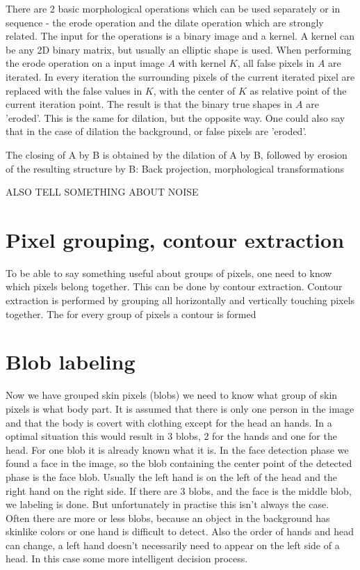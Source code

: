 There are 2 basic morphological operations which can be used separately or in sequence - the erode operation and the dilate operation which are strongly related. The input for the operations is a binary image and a kernel. A kernel can be any 2D binary matrix, but usually an elliptic shape is used. When performing the erode operation on a input image $A$ with kernel $K$, all false pixels in $A$ are iterated. In every iteration the surrounding pixels of the current iterated pixel are replaced with the false values in $K$, with the center of $K$ as relative point of the current iteration point. The result is that the binary true shapes in $A$ are 'eroded'. This is the same for dilation, but the opposite way. One could also say that in the case of dilation the background, or false pixels are 'eroded'.

The closing of A by B is obtained by the dilation of A by B, followed by erosion of the resulting structure by B:
Back projection, morphological transformations

ALSO TELL SOMETHING ABOUT NOISE

\section{Pixel grouping, contour extraction}
To be able to say something useful about groups of pixels, one need to know which pixels belong together. This can be done by contour extraction\cite{Suzuki85}. Contour extraction is performed by grouping all horizontally and vertically touching pixels together. The for every group of pixels a contour is formed

\section{Blob labeling}
Now we have grouped skin pixels (blobs) we need to know what group of skin pixels is what body part. It is assumed that there is only one person in the image and that the body is covert with clothing except for the head an hands. In a optimal situation this would result in 3 blobs, 2 for the hands and one for the head. For one blob it is already known what it is. In the face detection phase we found a face in the image, so the blob containing the center point of the detected phase is the face blob. Usually the left hand is on the left of the head and the right hand on the right side. If there are 3 blobs, and the face is the middle blob, we labeling is done. But unfortunately in practise this isn't always the case. Often there are more or less blobs, because an object in the background has skinlike colors or one hand is difficult to detect. Also the order of hands and head can change, a left hand doesn't necessarily need to appear on the left side of a head. In this case some more intelligent decision process. 

